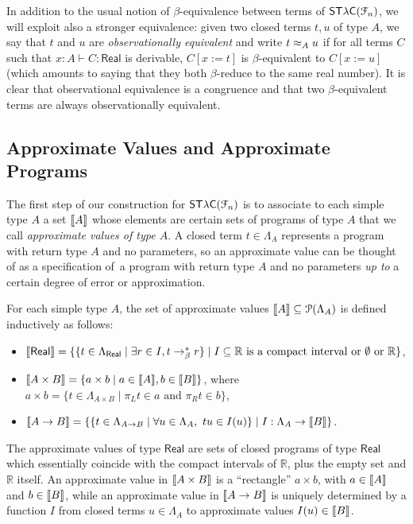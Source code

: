 In addition to the usual notion of $\beta$-equivalence between terms of $\mathsf{ST\lambda C}(\mathcal F_{n})$, we will exploit also a stronger equivalence: given two closed terms $t,u$ of type $A$,  we say that $t$ and $u$ are \emph{observationally equivalent} and write $t \approx_A u$ if for all terms $C$ such that $x:A \vdash C : \mathsf{Real}$ is derivable, $C[x:=t]$ is $\beta$-equivalent to $C[x:=u]$ (which amounts to saying that they both $\beta$-reduce to the same real number).  It is clear that observational equivalence is a congruence and that two $\beta$-equivalent terms are always observationally equivalent. %



\subsection{Approximate Values and Approximate Programs}

The first step of our construction for $\mathsf{ST\lambda C}(\mathcal F_{n})$ is to associate to each simple type $A$ a set $\llbracket A \rrbracket$ whose elements are certain sets of programs of type $A$ that we call \emph{approximate values of type $A$}. 
A closed term $t\in \Lambda_{A}$ represents a program with return type $A$ and no parameters, so an approximate value can be thought of as a specification of a program with return type $A$ and no parameters \emph{up to} a certain degree of error or approximation.

For each simple type $A$, the set of approximate values $\llbracket A \rrbracket\subseteq \mathcal P(\Lambda_A)$ is defined inductively as follows:
\begin{itemize}
\item $\llbracket \mathsf{Real} \rrbracket = \{ \{ t \in \Lambda_\mathsf{Real} \mid \exists r \in I, t \to_\beta^* r \} \mid I \subseteq \mathbb{R} \text{ is a compact interval or $\emptyset$ or } \mathbb{R} \}$,
\item $\llbracket A \times B \rrbracket = \{ a \times b \mid a  \in \llbracket A \rrbracket, b \in \llbracket B \rrbracket \}$, where $a \times b = \{ t \in \Lambda_{A \times B} \mid \pi_L t \in a \text{ and } \pi_R t \in b \}$,
\item $\llbracket A \to B \rrbracket = \{ \{ t \in \Lambda_{A \to B} \mid \forall u \in \Lambda_{A},~ tu \in I(u) \} \mid I : \Lambda_A \to \llbracket B \rrbracket \}$.
\end{itemize}

The approximate values of type $\mathsf{Real}$ are sets of closed programs of type $\mathsf{Real}$ which essentially coincide with the compact intervals of $\mathbb R$, plus the empty set and $\mathbb{R}$ itself. An approximate value in $\llbracket A\times B \rrbracket$ is a ``rectangle'' $a \times b$, with $a\in \llbracket A \rrbracket$ and $b \in \llbracket B \rrbracket$, while an approximate value in $\llbracket A\to B \rrbracket$ is uniquely determined by a function 
$I$ from closed terms $u\in \Lambda_{ A}$ to approximate values $I(u)\in \llbracket B \rrbracket$.


